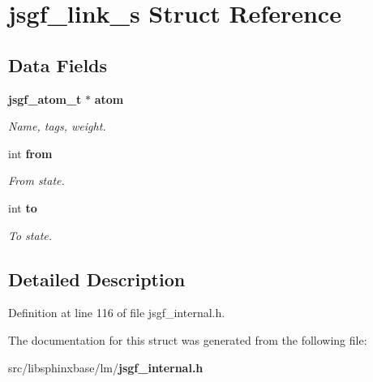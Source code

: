 \section{jsgf\-\_\-link\-\_\-s Struct Reference}
\label{structjsgf__link__s}
\subsection*{Data Fields}
\begin{DoxyCompactItemize}
\item 
{\bf jsgf\-\_\-atom\-\_\-t} $\ast$ {\bf atom}\label{structjsgf__link__s_a140a7cfbe76100928b9c7ea052435ca5}

\begin{DoxyCompactList}\small\item\em Name, tags, weight. \end{DoxyCompactList}\item 
int {\bf from}\label{structjsgf__link__s_a02f9b2bc3b98e802164e80d051923bb3}

\begin{DoxyCompactList}\small\item\em From state. \end{DoxyCompactList}\item 
int {\bf to}\label{structjsgf__link__s_a9da8ad9d87149f0cfca6ca815c581717}

\begin{DoxyCompactList}\small\item\em To state. \end{DoxyCompactList}\end{DoxyCompactItemize}


\subsection{Detailed Description}


Definition at line 116 of file jsgf\-\_\-internal.\-h.



The documentation for this struct was generated from the following file\-:\begin{DoxyCompactItemize}
\item 
src/libsphinxbase/lm/{\bf jsgf\-\_\-internal.\-h}\end{DoxyCompactItemize}

